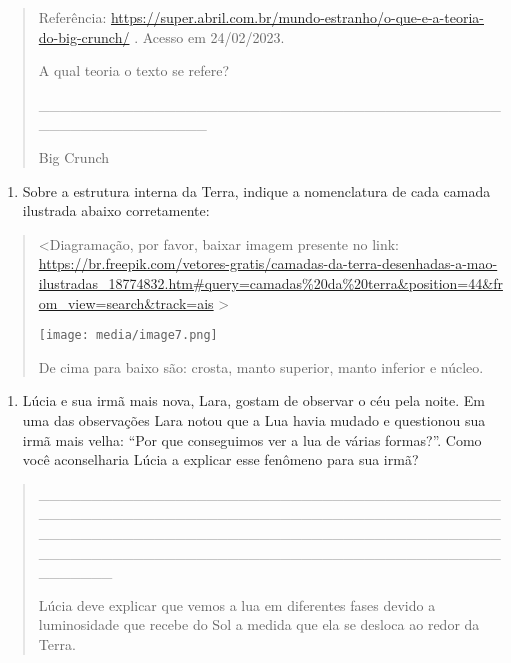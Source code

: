 \begin{quote}
Referência:
\url{https://super.abril.com.br/mundo-estranho/o-que-e-a-teoria-do-big-crunch/}
. Acesso em 24/02/2023.

A qual teoria o texto se refere?

\_\_\_\_\_\_\_\_\_\_\_\_\_\_\_\_\_\_\_\_\_\_\_\_\_\_\_\_\_\_\_\_\_\_\_\_\_\_\_\_\_\_\_\_\_\_\_\_\_\_\_\_\_\_\_\_\_\_\_\_

Big Crunch
\end{quote}

\begin{enumerate}
\def\labelenumi{\arabic{enumi}.}
\item
  Sobre a estrutura interna da Terra, indique a nomenclatura de cada
  camada ilustrada abaixo corretamente:
\end{enumerate}

\begin{quote}
\textless{}Diagramação, por favor, baixar imagem presente no link:
\url{https://br.freepik.com/vetores-gratis/camadas-da-terra-desenhadas-a-mao-ilustradas_18774832.htm\#query=camadas\%20da\%20terra\&position=44\&from_view=search\&track=ais}
\textgreater{}

\texttt{[image: media/image7.png]}

De cima para baixo são: crosta, manto superior, manto inferior e núcleo.
\end{quote}

\begin{enumerate}
\def\labelenumi{\arabic{enumi}.}
\item
  Lúcia e sua irmã mais nova, Lara, gostam de observar o céu pela noite.
  Em uma das observações Lara notou que a Lua havia mudado e questionou
  sua irmã mais velha: ``Por que conseguimos ver a lua de várias
  formas?''. Como você aconselharia Lúcia a explicar esse fenômeno para
  sua irmã?
\end{enumerate}

\begin{quote}
\_\_\_\_\_\_\_\_\_\_\_\_\_\_\_\_\_\_\_\_\_\_\_\_\_\_\_\_\_\_\_\_\_\_\_\_\_\_\_\_\_\_\_\_\_\_\_\_\_\_\_\_\_\_\_\_\_\_\_\_\_\_\_\_\_\_\_\_\_\_\_\_\_\_\_\_\_\_\_\_\_\_\_\_\_\_\_\_\_\_\_\_\_\_\_\_\_\_\_\_\_\_\_\_\_\_\_\_\_\_\_\_\_\_\_\_\_\_\_\_\_\_\_\_\_\_\_\_\_\_\_\_\_\_\_\_\_\_\_\_\_\_\_\_\_\_\_\_\_\_\_\_\_\_\_\_\_\_\_\_\_\_\_\_\_\_\_\_\_\_\_\_\_\_\_\_\_\_\_\_\_\_\_

Lúcia deve explicar que vemos a lua em diferentes fases devido a
luminosidade que recebe do Sol a medida que ela se desloca ao redor da
Terra.
\end{quote}

